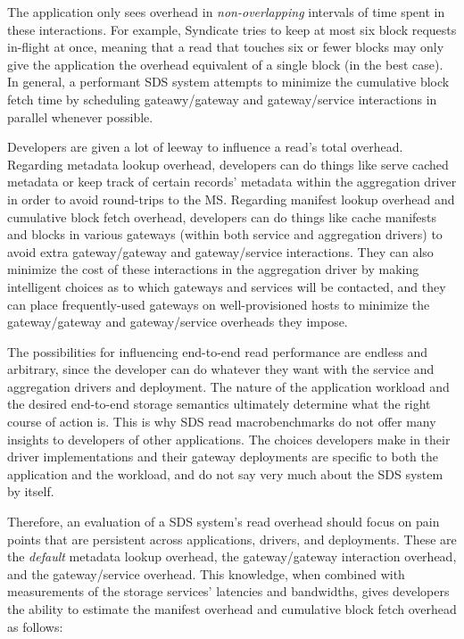 The application only sees overhead in \emph{non-overlapping} intervals of time spent
in these interactions.  For example, Syndicate tries to keep at most six block
requests in-flight at once, meaning that a read that touches six or fewer blocks
may only give the application the overhead equivalent of a single block (in the
best case).  In general, a performant SDS system attempts to minimize the cumulative block fetch time by
scheduling gateawy/gateway and gateway/service interactions in parallel whenever
possible.

Developers are given a lot of leeway to influence a read's total overhead.
Regarding metadata lookup overhead,
developers can do things like serve cached metadata or keep track of 
certain records' metadata within the aggregation driver in order to avoid
round-trips to the MS.  Regarding manifest lookup overhead and cumulative block
fetch overhead, developers can do things like cache manifests and blocks in various
gateways (within both service and aggregation drivers) 
to avoid extra gateway/gateway and gateway/service
interactions.  They can also minimize the cost of these interactions in the
aggregation driver by making intelligent choices as to which gateways and
services will be contacted, and they can place frequently-used gateways on well-provisioned
hosts to minimize the gateway/gateway and gateway/service overheads they impose.

The possibilities for influencing end-to-end read performance are endless and
arbitrary, since the developer can do whatever they want with the service and aggregation
drivers and deployment.  The nature of the application workload and the desired end-to-end
storage semantics ultimately determine what the right course of action is.
This is why SDS read macrobenchmarks do not offer many insights to developers of
other applications.  The choices developers
make in their driver implementations and their gateway
deployments are specific to both the application and the workload, and do
not say very much about the SDS system by itself.

Therefore, an evaluation of a SDS system's read overhead should focus on pain points
that are persistent across applications, drivers, and deployments.
These are the \emph{default} metadata lookup overhead, the gateway/gateway
interaction overhead, and the gateway/service overhead.  This knowledge, when
combined with measurements of the storage services' latencies and bandwidths,
gives developers the ability to estimate the manifest overhead and cumulative
block fetch overhead as follows:

